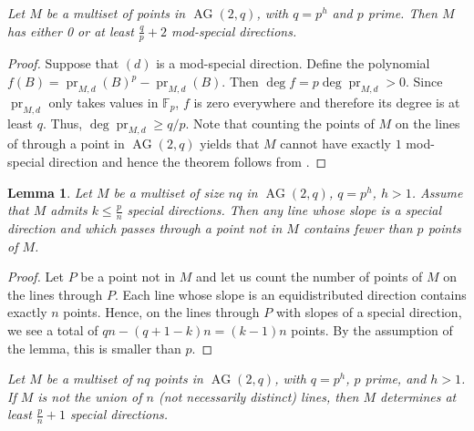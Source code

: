 \documentclass[12pt, a4paper]{article}
\newtheorem{lm}[thm]{Lemma}
\theoremstyle{definition}
\newcommand{\FF}{\mathbb F}
\DeclareMathOperator{\pr}{pr}
\DeclareMathOperator{\AG}{AG}
\newcommand{\ag}{\AG}
\begin{document}
  {\it
 Let $M$ be a multiset of points in $\ag(2,q)$, with $q=p^h$ and $p$ prime.
 Then $M$ has either 0 or at least $\frac qp + 2$ mod-special directions.
}

\begin{proof}
 Suppose that $(d)$ is a mod-special direction.
 Define the polynomial $f(B) = \pr_{M,d}(B)^p - \pr_{M,d}(B)$.
 Then $\deg f = p \deg \pr_{M,d} > 0$.
 Since $\pr_{M,d}$ only takes values in $\FF_p$, $f$ is zero everywhere and therefore its degree is at least $q$.
 Thus, $\deg \pr_{M,d} \geq q/p$. Note that counting the points of $M$ on the lines of through a point in $\ag(2,q)$ yields that $M$ cannot have exactly $1$ mod-special direction and hence
 the theorem follows from .
\end{proof}

\begin{lm}
\label{less than p points}
Let $M$ be a multiset of size $nq$ in $\ag(2,q)$, $q=p^h$, $h > 1$. Assume that $M$ admits $k \leq \frac{p}{n}$ special directions.
Then any line whose slope is a special direction and which passes through a point not in $M$ contains fewer than $p$ points of $M$. 
\end{lm}

\begin{proof}
Let $P$ be a point not in $M$ and let us count the number of points of $M$ on the lines through $P$. 
Each line whose slope is an equidistributed direction contains exactly $n$ points.
Hence, on the lines through $P$ with slopes of a special direction, we see a total of $qn - (q + 1 - k)n = (k - 1)n$ points. By the assumption of the lemma, this is smaller than $p$.   
\end{proof}

 {\it
 Let $M$ be a multiset of $nq$ points in $\ag(2,q)$, with $q=p^h$, $p$ prime, and $h > 1$.
 If $M$ is not the union of $n$ (not necessarily distinct) lines, then $M$ determines at least $\frac pn + 1$ special directions.
}
\end{document}
